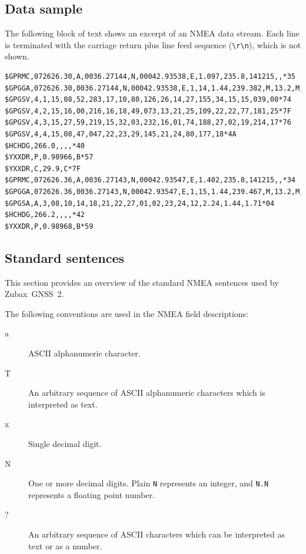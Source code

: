 \documentclass{zubaxdoc}
\begin{document}
\subsection{Data sample}

The following block of text shows an excerpt of an NMEA data stream.
Each line is terminated with the carriage return plus line feed sequence (\verb|\r\n|), which is not shown.

\begin{verbatim}
$GPRMC,072626.30,A,0036.27144,N,00042.93538,E,1.097,235.8,141215,,*35
$GPGGA,072626.30,0036.27144,N,00042.93538,E,1,14,1.44,239.382,M,13.2,M,,*5E
$GPGSV,4,1,15,08,52,283,17,10,80,126,26,14,27,155,34,15,15,039,08*74
$GPGSV,4,2,15,16,00,216,16,18,49,073,13,21,25,109,22,22,77,181,25*7F
$GPGSV,4,3,15,27,59,219,15,32,03,232,16,01,74,188,27,02,19,214,17*76
$GPGSV,4,4,15,08,47,047,22,23,29,145,21,24,80,177,18*4A
$HCHDG,266.0,,,,*40
$YXXDR,P,0.98966,B*57
$YXXDR,C,29.9,C*7F
$GPRMC,072626.36,A,0036.27143,N,00042.93547,E,1.402,235.8,141215,,*34
$GPGGA,072626.36,0036.27143,N,00042.93547,E,1,15,1.44,239.467,M,13.2,M,,*5A
$GPGSA,A,3,08,10,14,18,21,22,27,01,02,23,24,12,2.24,1.44,1.71*04
$HCHDG,266.2,,,,*42
$YXXDR,P,0.98968,B*59
\end{verbatim}

\subsection{Standard sentences}\label{nmea_standard_sentences}

This section provides an overview of the standard NMEA sentences used by Zubax~GNSS~2.

The following conventions are used in the NMEA field descriptions:
\begin{description}
    \item[a] ASCII alphanumeric character.
    \item[T] An arbitrary sequence of ASCII alphanumeric characters which is interpreted as text.
    \item[x] Single decimal digit.
    \item[N] One or more decimal digits. Plain \verb|N| represents an integer,
             and \verb|N.N| represents a floating point number.
    \item[?] An arbitrary sequence of ASCII characters which can be interpreted as text or as a number.
\end{description}

\clearpage
\end{document}
